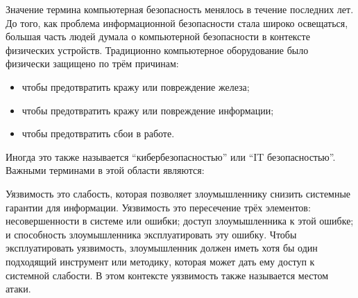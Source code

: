 
\graphicspath{ {imgs/} }






Значение термина компьютерная безопасность менялось в течение последних лет. До того, как проблема информационной безопасности стала широко освещаться, большая часть людей думала о компьютерной безопасности в контексте физических устройств. Традиционно компьютерное оборудование было физически защищено по трём причинам: \\

\begin{itemize}
  \item чтобы предотвратить кражу или повреждение железа;
  \item чтобы предотвратить кражу или повреждение информации;
  \item чтобы предотвратить сбои в работе.
\end{itemize}


Иногда это также называется ``кибербезопасностью'' или ``IT безопасностью''. Важными терминами в этой области являются: \\


Уязвимость это слабость, которая позволяет злоумышленнику снизить системные гарантии для информации. Уязвимость это пересечение трёх элементов: несовершенности в системе или ошибки; доступ злоумышленника к этой ошибке; и способность злоумышленника эксплуатировать эту ошибку. Чтобы эксплуатировать уязвимость, злоумышленник должен иметь хотя бы один подходящий инструмент или методику, которая может дать ему доступ к системной слабости. В этом контексте уязвимость также называется местом атаки. \\

